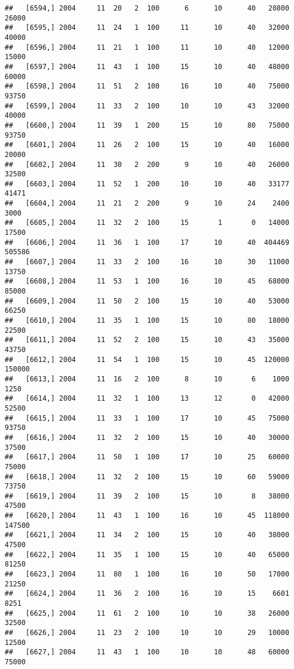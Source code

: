 \documentclass{article}\usepackage[]{graphicx}\usepackage[]{color}
\makeatletter
\newenvironment{kframe}{%
 \def\at@end@of@kframe{}%
 \ifinner\ifhmode%
  \def\at@end@of@kframe{\end{minipage}}%
  \begin{minipage}{\columnwidth}%
 \fi\fi%
 \def\FrameCommand##1{\hskip\@totalleftmargin \hskip-\fboxsep
 \colorbox{shadecolor}{##1}\hskip-\fboxsep
     \hskip-\linewidth \hskip-\@totalleftmargin \hskip\columnwidth}%
 \MakeFramed {\advance\hsize-\width
   \@totalleftmargin\z@ \linewidth\hsize
   \@setminipage}}%
 {\par\unskip\endMakeFramed%
 \at@end@of@kframe}
\newenvironment{knitrout}{}{} %
\makeatother
\begin{document}
\begin{knitrout}
\begin{kframe}
\begin{verbatim}
##   [6594,] 2004     11  20   2  100      6      10      40   20800   26000
##   [6595,] 2004     11  24   1  100     11      10      40   32000   40000
##   [6596,] 2004     11  21   1  100     11      10      40   12000   15000
##   [6597,] 2004     11  43   1  100     15      10      40   48000   60000
##   [6598,] 2004     11  51   2  100     16      10      40   75000   93750
##   [6599,] 2004     11  33   2  100     10      10      43   32000   40000
##   [6600,] 2004     11  39   1  200     15      10      80   75000   93750
##   [6601,] 2004     11  26   2  100     15      10      40   16000   20000
##   [6602,] 2004     11  30   2  200      9      10      40   26000   32500
##   [6603,] 2004     11  52   1  200     10      10      40   33177   41471
##   [6604,] 2004     11  21   2  200      9      10      24    2400    3000
##   [6605,] 2004     11  32   2  100     15       1       0   14000   17500
##   [6606,] 2004     11  36   1  100     17      10      40  404469  505586
##   [6607,] 2004     11  33   2  100     16      10      30   11000   13750
##   [6608,] 2004     11  53   1  100     16      10      45   68000   85000
##   [6609,] 2004     11  50   2  100     15      10      40   53000   66250
##   [6610,] 2004     11  35   1  100     15      10      80   18000   22500
##   [6611,] 2004     11  52   2  100     15      10      43   35000   43750
##   [6612,] 2004     11  54   1  100     15      10      45  120000  150000
##   [6613,] 2004     11  16   2  100      8      10       6    1000    1250
##   [6614,] 2004     11  32   1  100     13      12       0   42000   52500
##   [6615,] 2004     11  33   1  100     17      10      45   75000   93750
##   [6616,] 2004     11  32   2  100     15      10      40   30000   37500
##   [6617,] 2004     11  50   1  100     17      10      25   60000   75000
##   [6618,] 2004     11  32   2  100     15      10      60   59000   73750
##   [6619,] 2004     11  39   2  100     15      10       8   38000   47500
##   [6620,] 2004     11  43   1  100     16      10      45  118000  147500
##   [6621,] 2004     11  34   2  100     15      10      40   38000   47500
##   [6622,] 2004     11  35   1  100     15      10      40   65000   81250
##   [6623,] 2004     11  80   1  100     16      10      50   17000   21250
##   [6624,] 2004     11  36   2  100     16      10      15    6601    8251
##   [6625,] 2004     11  61   2  100     10      10      38   26000   32500
##   [6626,] 2004     11  23   2  100     10      10      29   10000   12500
##   [6627,] 2004     11  43   1  100     10      10      48   60000   75000

\end{verbatim}
\end{kframe}
\end{knitrout}
\end{document}
